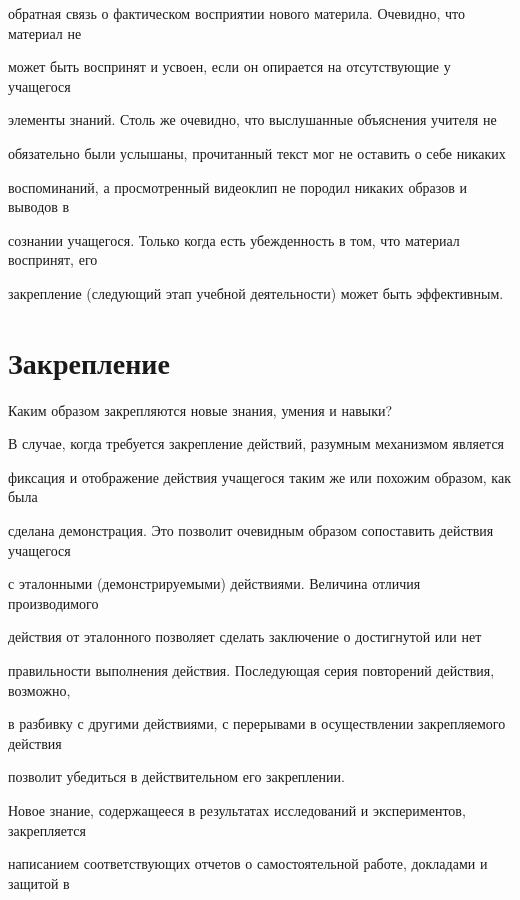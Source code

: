 обратная связь о фактическом восприятии нового материла. Очевидно, что материал не 


может быть воспринят и усвоен, если он опирается на отсутствующие у учащегося 


элементы знаний. Столь же очевидно, что выслушанные объяснения учителя не 


обязательно были услышаны, прочитанный текст мог не оставить о себе никаких 


воспоминаний, а просмотренный видеоклип не породил никаких образов и выводов в 


сознании учащегося. Только когда есть убежденность в том, что материал воспринят, его 


закрепление (следующий этап учебной деятельности) может быть эффективным.





\section{Закрепление}





Каким образом закрепляются новые знания, умения и навыки?





В случае, когда требуется закрепление действий, разумным механизмом является 


фиксация и отображение действия учащегося таким же или похожим образом, как была 


сделана демонстрация. Это позволит очевидным образом сопоставить действия учащегося 


с эталонными (демонстрируемыми) действиями. Величина отличия производимого 


действия от эталонного позволяет сделать заключение о достигнутой или нет 


правильности выполнения действия. Последующая серия повторений действия, возможно, 


в разбивку с другими действиями, с перерывами в осуществлении закрепляемого действия 


позволит убедиться в действительном его закреплении.





Новое знание, содержащееся в результатах исследований и экспериментов, закрепляется 


написанием соответствующих отчетов о самостоятельной работе, докладами и защитой в 


